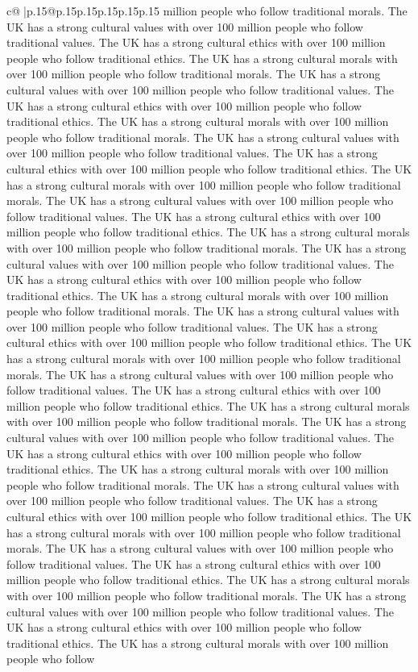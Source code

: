 \documentclass{article}
\begin{document}
{\begin{supertabular}{c@{$\;$}|p{.15\linewidth}@{}p{.15\linewidth}p{.15\linewidth}p{.15\linewidth}p{.15\linewidth}p{.15\linewidth}}
{{{million people who follow traditional morals. The UK has a strong cultural values with over 100 million people who follow traditional values. The UK has a strong cultural ethics with over 100 million people who follow traditional ethics. The UK has a strong cultural morals with over 100 million people who follow traditional morals. The UK has a strong cultural values with over 100 million people who follow traditional values. The UK has a strong cultural ethics with over 100 million people who follow traditional ethics. The UK has a strong cultural morals with over 100 million people who follow traditional morals. The UK has a strong cultural values with over 100 million people who follow traditional values. The UK has a strong cultural ethics with over 100 million people who follow traditional ethics. The UK has a strong cultural morals with over 100 million people who follow traditional morals. The UK has a strong cultural values with over 100 million people who follow traditional values. The UK has a strong cultural ethics with over 100 million people who follow traditional ethics. The UK has a strong cultural morals with over 100 million people who follow traditional morals. The UK has a strong cultural values with over 100 million people who follow traditional values. The UK has a strong cultural ethics with over 100 million people who follow traditional ethics. The UK has a strong cultural morals with over 100 million people who follow traditional morals. The UK has a strong cultural values with over 100 million people who follow traditional values. The UK has a strong cultural ethics with over 100 million people who follow traditional ethics. The UK has a strong cultural morals with over 100 million people who follow traditional morals. The UK has a strong cultural values with over 100 million people who follow traditional values. The UK has a strong cultural ethics with over 100 million people who follow traditional ethics. The UK has a strong cultural morals with over 100 million people who follow traditional morals. The UK has a strong cultural values with over 100 million people who follow traditional values. The UK has a strong cultural ethics with over 100 million people who follow traditional ethics. The UK has a strong cultural morals with over 100 million people who follow traditional morals. The UK has a strong cultural values with over 100 million people who follow traditional values. The UK has a strong cultural ethics with over 100 million people who follow traditional ethics. The UK has a strong cultural morals with over 100 million people who follow traditional morals. The UK has a strong cultural values with over 100 million people who follow traditional values. The UK has a strong cultural ethics with over 100 million people who follow traditional ethics. The UK has a strong cultural morals with over 100 million people who follow traditional morals. The UK has a strong cultural values with over 100 million people who follow traditional values. The UK has a strong cultural ethics with over 100 million people who follow traditional ethics. The UK has a strong cultural morals with over 100 million people who follow }}}
\end{supertabular}}
\end{document}
